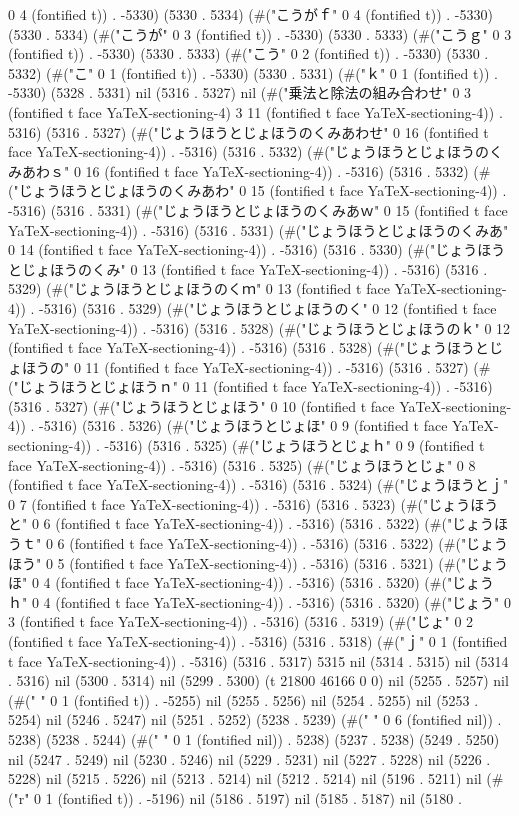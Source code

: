 {0 4 (fontified t)) . -5330) (5330 . 5334) (#("こうがｆ" 0 4 (fontified t)) . -5330) (5330 . 5334) (#("こうが" 0 3 (fontified t)) . -5330) (5330 . 5333) (#("こうｇ" 0 3 (fontified t)) . -5330) (5330 . 5333) (#("こう" 0 2 (fontified t)) . -5330) (5330 . 5332) (#("こ" 0 1 (fontified t)) . -5330) (5330 . 5331) (#("ｋ" 0 1 (fontified t)) . -5330) (5328 . 5331) nil (5316 . 5327) nil (#("乗法と除法の組み合わせ" 0 3 (fontified t face YaTeX-sectioning-4) 3 11 (fontified t face YaTeX-sectioning-4)) . 5316) (5316 . 5327) (#("じょうほうとじょほうのくみあわせ" 0 16 (fontified t face YaTeX-sectioning-4)) . -5316) (5316 . 5332) (#("じょうほうとじょほうのくみあわｓ" 0 16 (fontified t face YaTeX-sectioning-4)) . -5316) (5316 . 5332) (#("じょうほうとじょほうのくみあわ" 0 15 (fontified t face YaTeX-sectioning-4)) . -5316) (5316 . 5331) (#("じょうほうとじょほうのくみあｗ" 0 15 (fontified t face YaTeX-sectioning-4)) . -5316) (5316 . 5331) (#("じょうほうとじょほうのくみあ" 0 14 (fontified t face YaTeX-sectioning-4)) . -5316) (5316 . 5330) (#("じょうほうとじょほうのくみ" 0 13 (fontified t face YaTeX-sectioning-4)) . -5316) (5316 . 5329) (#("じょうほうとじょほうのくｍ" 0 13 (fontified t face YaTeX-sectioning-4)) . -5316) (5316 . 5329) (#("じょうほうとじょほうのく" 0 12 (fontified t face YaTeX-sectioning-4)) . -5316) (5316 . 5328) (#("じょうほうとじょほうのｋ" 0 12 (fontified t face YaTeX-sectioning-4)) . -5316) (5316 . 5328) (#("じょうほうとじょほうの" 0 11 (fontified t face YaTeX-sectioning-4)) . -5316) (5316 . 5327) (#("じょうほうとじょほうｎ" 0 11 (fontified t face YaTeX-sectioning-4)) . -5316) (5316 . 5327) (#("じょうほうとじょほう" 0 10 (fontified t face YaTeX-sectioning-4)) . -5316) (5316 . 5326) (#("じょうほうとじょほ" 0 9 (fontified t face YaTeX-sectioning-4)) . -5316) (5316 . 5325) (#("じょうほうとじょｈ" 0 9 (fontified t face YaTeX-sectioning-4)) . -5316) (5316 . 5325) (#("じょうほうとじょ" 0 8 (fontified t face YaTeX-sectioning-4)) . -5316) (5316 . 5324) (#("じょうほうとｊ" 0 7 (fontified t face YaTeX-sectioning-4)) . -5316) (5316 . 5323) (#("じょうほうと" 0 6 (fontified t face YaTeX-sectioning-4)) . -5316) (5316 . 5322) (#("じょうほうｔ" 0 6 (fontified t face YaTeX-sectioning-4)) . -5316) (5316 . 5322) (#("じょうほう" 0 5 (fontified t face YaTeX-sectioning-4)) . -5316) (5316 . 5321) (#("じょうほ" 0 4 (fontified t face YaTeX-sectioning-4)) . -5316) (5316 . 5320) (#("じょうｈ" 0 4 (fontified t face YaTeX-sectioning-4)) . -5316) (5316 . 5320) (#("じょう" 0 3 (fontified t face YaTeX-sectioning-4)) . -5316) (5316 . 5319) (#("じょ" 0 2 (fontified t face YaTeX-sectioning-4)) . -5316) (5316 . 5318) (#("ｊ" 0 1 (fontified t face YaTeX-sectioning-4)) . -5316) (5316 . 5317) 5315 nil (5314 . 5315) nil (5314 . 5316) nil (5300 . 5314) nil (5299 . 5300) (t 21800 46166 0 0) nil (5255 . 5257) nil (#(" " 0 1 (fontified t)) . -5255) nil (5255 . 5256) nil (5254 . 5255) nil (5253 . 5254) nil (5246 . 5247) nil (5251 . 5252) (5238 . 5239) (#("      " 0 6 (fontified nil)) . 5238) (5238 . 5244) (#(" " 0 1 (fontified nil)) . 5238) (5237 . 5238) (5249 . 5250) nil (5247 . 5249) nil (5230 . 5246) nil (5229 . 5231) nil (5227 . 5228) nil (5226 . 5228) nil (5215 . 5226) nil (5213 . 5214) nil (5212 . 5214) nil (5196 . 5211) nil (#("r" 0 1 (fontified t)) . -5196) nil (5186 . 5197) nil (5185 . 5187) nil (5180 . }
